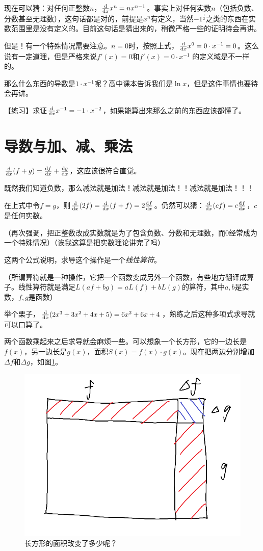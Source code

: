 现在可以猜：对任何正整数$n$，$\frac{\mathop{}\!\mathrm{d}}{\mathop{}\!\mathrm{d} x} x^n=n x^{n-1}$。事实上对任何实数$n$（包括负数、分数甚至无理数），这句话都是对的，前提是$x^n$有定义，当然$-1^{\frac{1}{2}}$之类的东西在实数范围里是没有定义的。目前这句话是猜出来的，稍微严格一些的证明待会再讲。

但是！有一个特殊情况需要注意。$n=0$时，按照上式，$\frac{\mathop{}\!\mathrm{d}}{\mathop{}\!\mathrm{d} x} x^0=0 \cdot x^{-1}=0$。这么说有一定道理，但是严格来说$f'(x)=0$和$f'(x)=0 \cdot x^{-1}$ 的定义域是不一样的。

那么什么东西的导数是$1 \cdot x^{-1}$呢？高中课本告诉我们是$\ln x$，但是这件事情也要待会再讲。

【练习】求证$\frac{\mathop{}\!\mathrm{d}}{\mathop{}\!\mathrm{d} x} x^{-1}=-1 \cdot x^{-2}$，如果能算出来那么之前的东西应该都懂了。
\section{导数与加、减、乘法}
$\frac{\mathop{}\!\mathrm{d}}{\mathop{}\!\mathrm{d} x}(f+g)=\frac{\mathop{}\!\mathrm{d} f}{\mathop{}\!\mathrm{d} x}+\frac{\mathop{}\!\mathrm{d} g}{\mathop{}\!\mathrm{d} x}$，这应该很符合直觉。

既然我们知道负数，那么减法就是加法！减法就是加法！！减法就是加法！！！

在上式中令$f=g$，则$\frac{\mathop{}\!\mathrm{d}}{\mathop{}\!\mathrm{d} x}(2f)=\frac{\mathop{}\!\mathrm{d}}{\mathop{}\!\mathrm{d} x}(f+f)=2\frac{\mathop{}\!\mathrm{d} f}{\mathop{}\!\mathrm{d} x}$。仍然可以猜：$\frac{\mathop{}\!\mathrm{d}}{\mathop{}\!\mathrm{d} x}(c f)=c \frac{\mathop{}\!\mathrm{d} f}{\mathop{}\!\mathrm{d} x}$，$c$是任何实数。

（再次强调，把正整数改成实数就是为了包含负数、分数和无理数，而$0$经常成为一个特殊情况）（诶我这算是把实数理论讲完了吗）

这两个公式说明，求导这个操作是一个\emph{线性算符}。

（所谓算符就是一种操作，它把一个函数变成另外一个函数，有些地方翻译成算子。线性算符就是满足$L(a f+b g)=a L(f)+b L(g)$的算符，其中$a,b$是实数，$f,g$是函数）

举个栗子，$\frac{\mathop{}\!\mathrm{d}}{\mathop{}\!\mathrm{d} x}(2x^3+3x^2+4x+5)=6x^2+6x+4$，熟练之后这种多项式求导就可以口算了。

两个函数乘起来之后求导就会麻烦一些。可以想象一个长方形，它的一边长是$f(x)$，另一边长是$g(x)$，面积$S(x)=f(x) \cdot g(x)$。现在把两边分别增加$\Delta f$和$\Delta g$，如图\ref{fig-rect}。
\begin{figure}[htb]
\centering
\includegraphics[scale=0.5]{fig/rect}
\caption{长方形的面积改变了多少呢？}
\label{fig-rect}
\end{figure}

